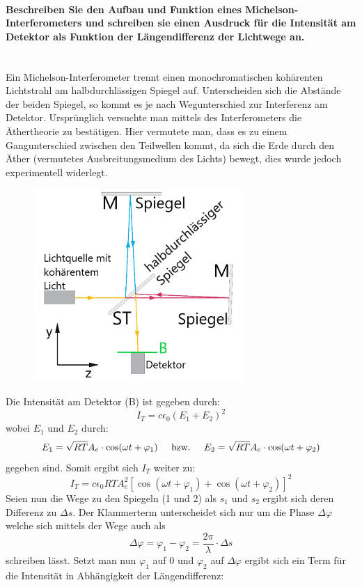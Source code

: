 \documentclass[a4paper, 11pt, ngerman, parskip=half-]{scrartcl}
\newcommand{\myparagraph}[1]{\paragraph{#1}\mbox{}\\}
\begin{document}
\myparagraph{Beschreiben Sie den Aufbau und Funktion eines Michelson-Interferometers und schreiben
    sie einen Ausdruck für die Intensität am Detektor als Funktion der Längendifferenz der
    Lichtwege an.}

Ein Michelson-Interferometer trennt einen monochromatischen kohärenten Lichtstrahl am halbdurchlässigen Spiegel auf. Unterscheiden sich die Abstände der beiden Spiegel, so kommt es
je nach Wegunterschied zur Interferenz am Detektor. Ursprünglich versuchte man mittels des Interferometers die Äthertheorie zu bestätigen. Hier vermutete man, dass es zu einem Gangunterschied
zwischen den Teilwellen kommt, da sich die Erde durch den Äther (vermutetes Ausbreitungsmedium des Lichts) bewegt, dies wurde jedoch experimentell widerlegt.
\begin{figure}[H]
    \centering
    \includegraphics[width=8cm]{image/18_Interferenz/Michelson_Interferometer.png}
\end{figure}
Die Intensität am Detektor (B) ist gegeben durch:
\[I_T = c \epsilon_0 (E_1+E_2)^2\]
wobei $E_1$ und $E_2$ durch:
\[E_1 = \sqrt{RT} A_e \cdot \cos(\omega t + \varphi_1) \hspace{5mm} \text{bzw.} \hspace{5mm} E_2 = \sqrt{RT} A_e \cdot \cos(\omega t + \varphi_2)\]
gegeben sind. Somit ergibt sich $I_T$ weiter zu:
\[I_T = c \epsilon_0 RT A_e^2[\cos(\omega t + \varphi_1) + \cos(\omega t + \varphi_2)]^2\]
Seien nun die Wege zu den Spiegeln (1 und 2) als $s_1$ und $s_2$ ergibt sich deren Differenz zu $\Delta s$.
Der Klammerterm unterscheidet sich nur um die Phase $\Delta \varphi$ welche sich mittels der Wege auch als
\[\Delta \varphi = \varphi_1 - \varphi_2 = \frac{2\pi}{\lambda}\cdot \Delta s\]
schreiben lässt. Setzt man nun $\varphi_1$ auf 0 und $\varphi_2$ auf $\Delta \varphi$ ergibt sich ein Term für die Intensität in Abhängigkeit der Längendifferenz:
\end{document}
